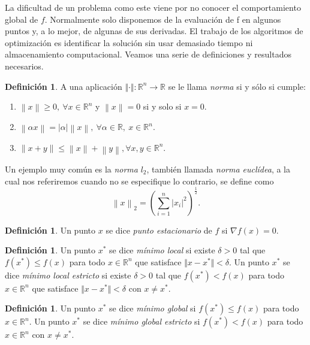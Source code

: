 \documentclass[11pt,a4paper]{book}
\theoremstyle{definition}
\newtheorem{definition}[theorem]{Definición}
\theoremstyle{remark}
\newcommand{\norm}[1]{\left\lVert#1\right\rVert}
\begin{document}
La dificultad de un problema como este viene por no conocer el comportamiento
global de $f$. Normalmente solo disponemos de la evaluación de f en algunos puntos y,
a lo mejor, de algunas de sus derivadas. El trabajo de los algoritmos de
optimización es identificar la solución sin usar demasiado tiempo ni almacenamiento computacional.
Veamos una serie de definiciones y resultados necesarios.
 
\begin{definition}
	A una aplicación $\Vert \cdot \Vert : \mathbb{R}^n \to \mathbb{R}$ se le llama \textit{norma} si y sólo si cumple:
	\vspace{-0.4cm}
	\begin{enumerate}
		\item $\norm{x} \geq 0, \: \forall x \in \mathbb{R}^n$ y $\norm{x}=0$ si y solo si $x=0$.
		\item $\norm{\alpha x} = \vert \alpha \vert \norm{x},\: \forall \alpha \in \mathbb{R},\: x\in \mathbb{R}^n.$
		\item $\norm{x+y} \leq \norm{x} + \norm{y}, \forall x,y \in \mathbb{R}^n$.
	\end{enumerate}
\end{definition}

Un ejemplo muy común es la
\textit{norma} $l_2$, también llamada \textit{norma euclídea}, a la cual nos referiremos cuando no se especifique lo contrario, se define como
\begin{equation}
		\norm{x}_2 = \left( \sum_{i=1}^n \vert x_i \vert^2 \right)^{\frac{1}{2}}.
\end{equation}

\begin{definition}
	Un punto $x$ se dice \textit{punto estacionario} de $f$ si $\nabla f(x) = 0$.
\end{definition}

\begin{definition}
	Un punto $x^*$ se dice \textit{mínimo local} si existe $\delta > 0$ tal que $f(x^*) \leq f(x)$ para todo $x \in \mathbb{R}^n$ que satisface $\Vert x - x^* \Vert < \delta$.
	Un punto $x^*$ se dice \textit{mínimo local estricto} si existe $\delta > 0$ tal que $f(x^*) < f(x)$ para todo $x \in \mathbb{R}^n$ que satisface $\Vert x - x^* \Vert < \delta$ con $x \neq x^*$.
\end{definition}

\begin{definition}
	Un punto $x^*$ se dice \textit{mínimo global} si $f(x^*) \leq f(x)$ para todo $x \in \mathbb{R}^n$.
	Un punto $x^*$ se dice \textit{mínimo global estricto} si $f(x^*) < f(x)$ para todo $x \in \mathbb{R}^n$ con $x \neq x^*$.
\end{definition}
\end{document}
